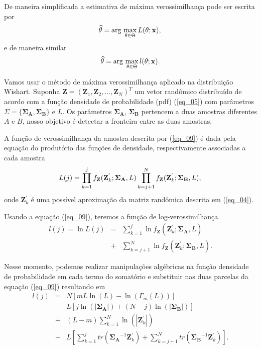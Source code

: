 \documentclass[conference]{IEEEtran}
\begin{document}
De maneira simplificada a estimativa de máxima verossimilhança pode ser escrita por 
\begin{equation*}
    \widehat{\theta}= \text{arg}\,\max\limits_{\theta\in\Theta}L(\theta;\mathbf{x}),\\
\end{equation*}
e de maneira similar 
\begin{equation*}
    \widehat{\theta}= \text{arg}\,\max\limits_{\theta\in\Theta}l(\theta;\mathbf{x}).\\
\end{equation*}

Vamos usar o método de máxima verossimilhança aplicado na distribuição Wishart. Suponha $\mathbf{Z}=(\mathbf{Z}_1,\mathbf{Z}_2,\dots,\mathbf{Z}_N)^T$ um vetor randômico distribuído de acordo com a função densidade de probabilidade (pdf) (\ref{eq_05}) com parâmetros $\Sigma=\{\mathbf{\Sigma_A}, \mathbf{\Sigma_B\}}$ e $L$. Os parâmetros $\mathbf{\Sigma_A}$, $\mathbf{\Sigma_B}$ pertencem a duas amostras diferentes $A$ e $B$, nosso objetivo é detectar a fronteira entre as duas amostras.

A função de verossimilhança da amostra descrita por (\ref{eq_09}) é dada pela equação do produtório das funções de densidade, respectivamente associadas a cada amostra
\begin{equation}\label{eq_10}
	L(j)=\prod_{k=1}^{j}f_{\mathbf{Z}}(\mathbf{Z}_{k}^{'};\mathbf{\Sigma_{A}},L) \prod_{k=j+1}^{N}f_{\mathbf{Z}}(\mathbf{Z}_{k}^{'};\mathbf{\Sigma_{B}},L), \\
\end{equation}
onde $\mathbf{Z}_{k}^{'}$ é uma possível aproximação da matriz randômica descrita em (\ref{eq_04}).

Usando a equação (\ref{eq_09}), teremos a  função de log-verossimilhança.
\begin{equation}
\begin{array}{rcl}\label{eq_11}
	l(j)=\ln L(j)&=&\sum_{k=1}^{j}\ln f_{\mathbf{Z}}(\mathbf{Z}_{k}^{'};\mathbf{\Sigma_{A}},L)\\
	             &+&\sum_{k=j+1}^{N}\ln f_{\mathbf{Z}}(\mathbf{Z}_{k}^{'};\mathbf{\Sigma_{B}},L).
\end{array}
\end{equation}

Nesse momento, podemos realizar  manipulações algébricas na função densidade de probabilidade em cada termo do somatório e substituir nas duas parcelas da equação (\ref{eq_09}) resultando em
\begin{equation}
\begin{array}{lll}\label{eq_12}
	l(j)&=&N\left[mL\ln{\left(L\right)}-\ln{\left(\Gamma_m(L)\right)}\right]\\
	&-& L\left[j\ln{\left(|\mathbf{\Sigma_{A}}|\right)}+(N-j)\ln{\left(|\mathbf{\Sigma_{B}}|\right)}\right] \\
	&+&(L-m)\sum_{k=1}^{N}\ln{\left(|\mathbf{Z}_{k}^{'}|\right)}\\
	&-&L\left[\sum_{k=1}^{j}tr(\mathbf{\Sigma_{A}}^{-1}\mathbf{Z}_{k}^{'})+ \sum_{k=j+1}^{N}tr(\mathbf{\Sigma_{B}}^{-1}\mathbf{Z}_{k}^{'})\right]. \\
\end{array}
\end{equation}
\end{document}
